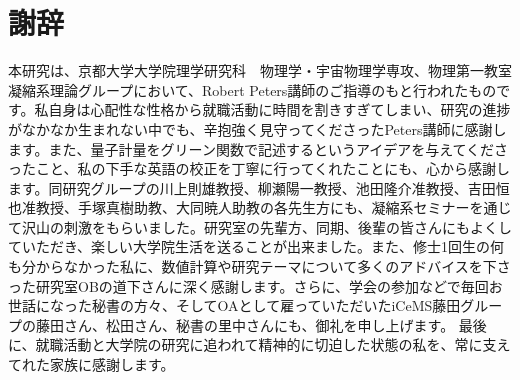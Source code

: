 \documentclass[12pt]{jsbook}
\begin{document}
\chapter*{謝辞}
本研究は、京都大学大学院理学研究科　物理学・宇宙物理学専攻、物理第一教室　凝縮系理論グループにおいて、Robert Peters講師のご指導のもと行われたものです。私自身は心配性な性格から就職活動に時間を割きすぎてしまい、研究の進捗がなかなか生まれない中でも、辛抱強く見守ってくださったPeters講師に感謝します。また、量子計量をグリーン関数で記述するというアイデアを与えてくださったこと、私の下手な英語の校正を丁寧に行ってくれたことにも、心から感謝します。同研究グループの川上則雄教授、柳瀬陽一教授、池田隆介准教授、吉田恒也准教授、手塚真樹助教、大同暁人助教の各先生方にも、凝縮系セミナーを通じて沢山の刺激をもらいました。研究室の先輩方、同期、後輩の皆さんにもよくしていただき、楽しい大学院生活を送ることが出来ました。また、修士1回生の何も分からなかった私に、数値計算や研究テーマについて多くのアドバイスを下さった研究室OBの道下さんに深く感謝します。さらに、学会の参加などで毎回お世話になった秘書の方々、そしてOAとして雇っていただいたiCeMS藤田グループの藤田さん、松田さん、秘書の里中さんにも、御礼を申し上げます。
最後に、就職活動と大学院の研究に追われて精神的に切迫した状態の私を、常に支えてれた家族に感謝します。

\end{document}
